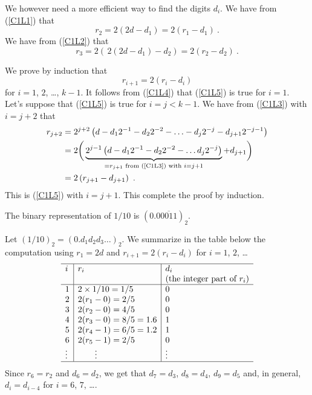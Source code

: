 We however need a more efficient way to find the digits $d_i$.  We
have from (\ref{C1L1}) that
\begin{equation} \label{C1L4}
  r_2 = 2 (2d - d_1) = 2(r_1 - d_1)\ .
\end{equation}
We have from (\ref{C1L2}) that
\[
r_3 = 2 (\, 2 (2 d - d_1) - d_2 ) = 2 ( r_2 - d_2) \  .
\]

We prove by induction that
\begin{equation} \label{C1L5}
  r_{i+1} = 2 (r_i - d_i )
\end{equation}
for $i=1$, $2$, \ldots, $k-1$.  It follows from (\ref{C1L4}) that
(\ref{C1L5}) is true for $i=1$.  Let's suppose that
(\ref{C1L5}) is true for $i=j<k-1$.  We have from (\ref{C1L3})
with $i=j+2$ that
\begin{align*}
r_{j+2} &= 2^{j+2}\left( d - d_1 2^{-1} - d_2 2^{-2} - \ldots
- d_j 2^{-j} - d_{j+1} 2^{-j-1}\right) \\
&= 2 \bigg( \underbrace{ 2^{j-1} \left( d - d_1 2^{-1} - d_2 2^{-2} - \ldots
d_j 2^{-j}\right)}_{=r_{j+1}\text{ from (\ref{C1L3}) with } i=j+1}
  + d_{j+1} \bigg) \\
&= 2 \left( r_{j+1} - d_{j+1}\right) \ .
\end{align*}
This is (\ref{C1L5}) with $i=j+1$.  This complete the proof by
induction.

\begin{egg}
The binary representation of $1/10$ is $(0.0\overline{0011})_2$.

Let $(1/10)_2 = (0.d_1 d_2 d_3 \ldots)_2$.  We summarize in the
table below the computation using $r_1 = 2 d$ and
$r_{i+1} = 2 (r_i - d_i )$ for $i=1$, $2$, \ldots
\[
\begin{array}{l|l|l}
\hline
i & r_ i & d_i \\
 & & \text{(the integer part of $r_i$)} \\
\hline
1 & 2 \times 1/10 = 1/5 & 0 \\
2 & 2 (r_1 - 0) = 2/5 & 0 \\
3 & 2 (r_2 - 0) = 4/5 & 0 \\
4 & 2 (r_3 - 0) = 8/5 = 1.6 & 1 \\
5 & 2 (r_4 - 1) = 6/5 = 1.2 & 1 \\
6 & 2 (r_5 - 1) = 2/5 & 0 \\
\vdots & \qquad \vdots & \vdots \\
\hline
\end{array}
\]
Since $r_6 = r_2$ and $d_6 = d_2$, we get that $d_7 = d_3$,
$d_8=d_4$, $d_9 = d_5$ and, in general, $d_i= d_{i-4}$ for $i=6$, $7$,
\ldots.
\end{egg}

